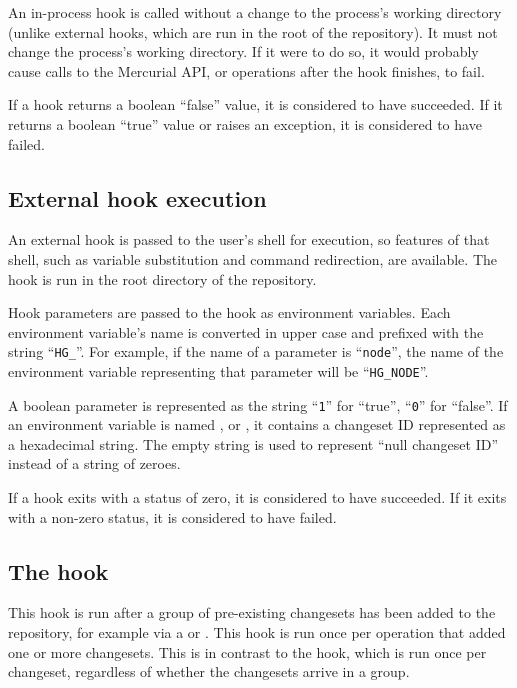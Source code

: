 An in-process hook is called without a change to the process's working
directory (unlike external hooks, which are run in the root of the
repository).  It must not change the process's working directory.  If
it were to do so, it would probably cause calls to the Mercurial API,
or operations after the hook finishes, to fail.

If a hook returns a boolean ``false'' value, it is considered to
have succeeded.  If it returns a boolean ``true'' value or raises an
exception, it is considered to have failed.

\subsection{External hook execution}

An external hook is passed to the user's shell for execution, so
features of that shell, such as variable substitution and command
redirection, are available.  The hook is run in the root directory of
the repository.

Hook parameters are passed to the hook as environment variables.  Each
environment variable's name is converted in upper case and prefixed
with the string ``\texttt{HG\_}''.  For example, if the name of a
parameter is ``\texttt{node}'', the name of the environment variable
representing that parameter will be ``\texttt{HG\_NODE}''.

A boolean parameter is represented as the string ``\texttt{1}'' for
``true'', ``\texttt{0}'' for ``false''.  If an environment variable is
named ,  or , it
contains a changeset ID represented as a hexadecimal string.  The
empty string is used to represent ``null changeset ID'' instead of a
string of zeroes.

If a hook exits with a status of zero, it is considered to have
succeeded.  If it exits with a non-zero status, it is considered to
have failed.

\subsection{The  hook}
\label{sec:hook:changegroup}

This hook is run after a group of pre-existing changesets has been
added to the repository, for example via a  or
.  This hook is run once per operation that added one
or more changesets.  This is in contrast to the  hook,
which is run once per changeset, regardless of whether the changesets
arrive in a group.

